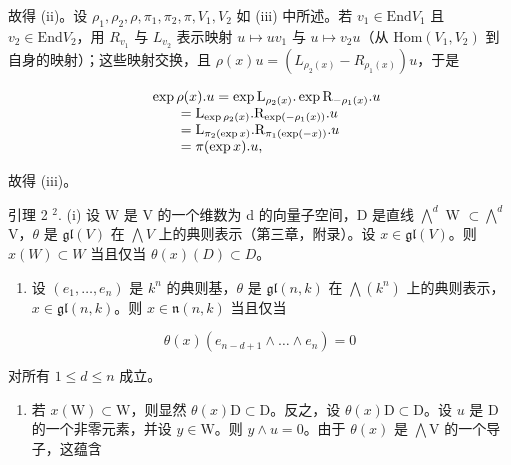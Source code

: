 故得 (ii)。设 \(\rho_1, \rho_2, \rho, \pi_1, \pi_2, \pi, V_1, V_2\) 如 (iii) 中所述。若 \(v_1 \in \mathrm{End}V_1\) 且 \(v_2 \in \mathrm{End}V_2\)，用 \(R_{v_1}\) 与 \(L_{v_2}\) 表示映射 \(u \mapsto uv_1\) 与 \(u \mapsto v_2u\)（从 \(\mathrm{Hom}(V_1, V_2)\) 到自身的映射）；这些映射交换，且 \(\rho(x)u = (L_{\rho_2(x)} - R_{\rho_1(x)})u\)，于是

\[
\begin{array}{r l} & {\exp \rho (x). u = \exp \mathrm{L} _ {\rho_ {2} (x)}. \exp \mathrm{R} _ {- \rho_ {1} (x)}. u} \\ & {\qquad = \mathrm{L} _ {\exp \rho_ {2} (x)}. \mathrm{R} _ {\exp (- \rho_ {1} (x))}. u} \\ & {\qquad = \mathrm{L} _ {\pi_ {2} (\exp x)}. \mathrm{R} _ {\pi_ {1} (\exp (- x))}. u} \\ & {\qquad = \pi (\exp x). u,} \end{array}
\]

故得 (iii)。

引理 2 \(^{2}\). (i) 设 W 是 V 的一个维数为 d 的向量子空间，D 是直线 \(\bigwedge^{d}\) W \(\subset \bigwedge^{d}\) V，\(\theta\) 是 \(\mathfrak{gl}(V)\) 在 \(\bigwedge V\) 上的典则表示（第三章，附录）。设 \(x \in \mathfrak{gl}(V)\)。则 \(x(W) \subset W\) 当且仅当 \(\theta(x)(D) \subset D\)。

\begin{enumerate}
\def\labelenumi{(\roman{enumi})}
\setcounter{enumi}{1}
\tightlist
\item
  设 \((e_{1},\ldots,e_{n})\) 是 \(k^{n}\) 的典则基，\(\theta\) 是 \(\mathfrak{gl}(n,k)\) 在 \(\bigwedge(k^{n})\) 上的典则表示，\(x\in\mathfrak{gl}(n,k)\)。则 \(x\in\mathfrak{n}(n,k)\) 当且仅当
\end{enumerate}

\[
\theta (x) (e _ {n - d + 1} \wedge \dots \wedge e _ {n}) = 0
\]

对所有 \(1 \leq d \leq n\) 成立。


\begin{enumerate}
\def\labelenumi{(\roman{enumi})}
\tightlist
\item
  若 \(x(\mathrm{W}) \subset \mathrm{W}\)，则显然 \(\theta(x)\mathrm{D} \subset \mathrm{D}\)。反之，设 \(\theta(x)\mathrm{D} \subset \mathrm{D}\)。设 \(u\) 是 \(\mathrm{D}\) 的一个非零元素，并设 \(y \in \mathrm{W}\)。则 \(y \wedge u = 0\)。由于 \(\theta(x)\) 是 \(\bigwedge \mathrm{V}\) 的一个导子，这蕴含
\end{enumerate}

